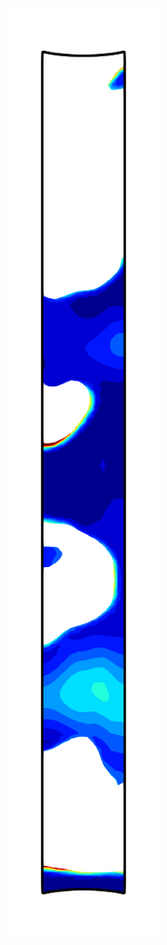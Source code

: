 \begin{figure}[!htb]
\begin{subfigure}{0.08\textwidth}
  \end{subfigure}
  \begin{subfigure}{0.08\textwidth}
    \centering
    \includegraphics[width=\textwidth]{Chapter5/figures/spallation/psii_4}

\end{subfigure}
\end{figure}
